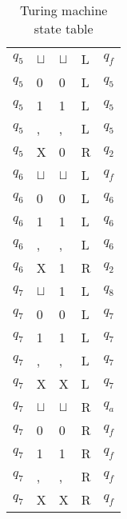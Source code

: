 \documentclass[a4paper, hidelinks, twocolumn, 9pt]{article}
\newcommand{\blm}{\sqcup}
\newcommand{\bl}{\(\blm\)}
\begin{document}
\begin{table}
\begin{tabular}{x{1cm}x{1cm}x{1cm}x{1cm}x{1cm}}
      \(q_5\) & \bl & \bl & L & \(q_f\) \\
      \(q_5\) &   0 &   0 & L & \(q_5\) \\
      \(q_5\) &   1 &   1 & L & \(q_5\) \\
      \(q_5\) &   , &   , & L & \(q_5\) \\
      \(q_5\) &   X &   0 & R & \(q_2\) \\
      \midrule
      \(q_6\) & \bl & \bl & L & \(q_f\) \\
      \(q_6\) &   0 &   0 & L & \(q_6\) \\
      \(q_6\) &   1 &   1 & L & \(q_6\) \\
      \(q_6\) &   , &   , & L & \(q_6\) \\
      \(q_6\) &   X &   1 & R & \(q_2\) \\
      \midrule
      \(q_7\) & \bl &   1 & L & \(q_8\) \\
      \(q_7\) &   0 &   0 & L & \(q_7\) \\
      \(q_7\) &   1 &   1 & L & \(q_7\) \\
      \(q_7\) &   , &   , & L & \(q_7\) \\
      \(q_7\) &   X &   X & L & \(q_7\) \\
      \midrule
      \(q_7\) & \bl & \bl & R & \(q_a\) \\
      \(q_7\) &   0 &   0 & R & \(q_f\) \\
      \(q_7\) &   1 &   1 & R & \(q_f\) \\
      \(q_7\) &   , &   , & R & \(q_f\) \\
      \(q_7\) &   X &   X & R & \(q_f\) \\
      \bottomrule
    \end{tabular}
    \caption{Turing machine state table}
    \label{table:statetable}
  \end{table}
    
 
\end{document}

